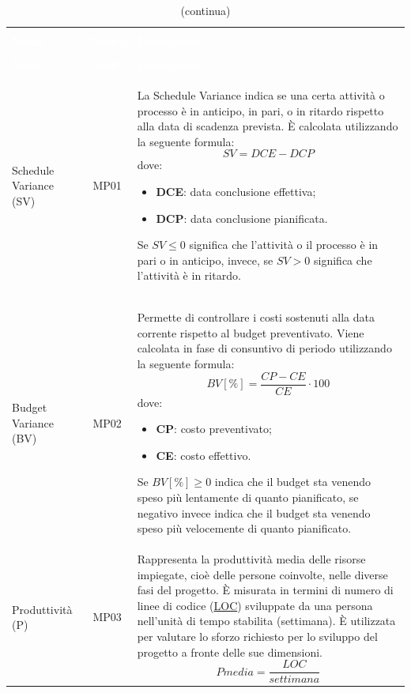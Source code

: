 \begin{longtable}{ C{4.5cm} c L{9.5cm} }
	\caption{Metriche dei processi}\\
		\textcolor{white}{\textbf{Nome}} & \textcolor{white}{\textbf{Codice}} & \centerline{\textcolor{white}{\textbf{Descrizione}}} \\
		\endfirsthead
		\caption[]{(continua)} \\
		\textcolor{white}{\textbf{Nome}} & \textcolor{white}{\textbf{Codice}} & \centerline{\textcolor{white}{\textbf{Descrizione}}} \\
		\endhead
		Schedule Variance (SV)  & MP01 & La Schedule Variance indica se una certa attività o processo è in anticipo, in pari, o in ritardo rispetto alla data di scadenza prevista. È calcolata utilizzando la seguente formula: \newline
\[ SV = DCE-DCP\]
dove: \begin{itemize}
\item \textbf{DCE}: data conclusione effettiva;
\item \textbf{DCP}: data conclusione pianificata.
\end{itemize}
Se $SV \leq 0$ significa che l'attività o il processo è in pari o in anticipo, invece, se $SV > 0$ significa che l'attività è in ritardo. \\	
		Budget Variance (BV) & MP02 & Permette di controllare i costi sostenuti alla data corrente rispetto al budget preventivato. Viene calcolata in fase di consuntivo di periodo utilizzando la seguente formula: \newline
		\[ BV[\%] = \frac{CP-CE}{CE}\cdot 100 \]		
dove: \begin{itemize}
\item \textbf{CP}: costo preventivato;
\item \textbf{CE}: costo effettivo.
\end{itemize}
Se $BV[\%] \geq 0$ indica che il budget sta venendo speso più lentamente di quanto pianificato, se negativo invece indica che il budget sta venendo speso più velocemente di quanto pianificato. \\
Produttività (P) & MP03 & Rappresenta la produttività media delle risorse impiegate, cioè delle persone coinvolte, nelle diverse fasi del progetto. È misurata in termini di numero di linee di codice (\hyperref[par:MS01]{LOC}) sviluppate da una persona nell’unità di tempo stabilita (settimana). È utilizzata per valutare lo sforzo richiesto per lo sviluppo  del progetto a fronte delle sue dimensioni. 
\[ Pmedia = \frac{LOC}{settimana}\]
	\end{longtable}
